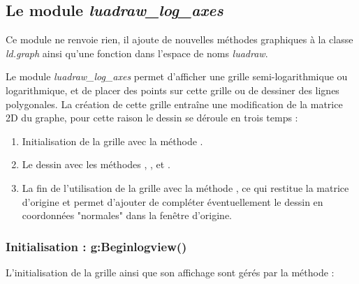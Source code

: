 \subsection{Le module \emph{luadraw\_log\_axes}}

Ce module ne renvoie rien, il ajoute de nouvelles méthodes graphiques à la classe \emph{ld.graph} ainsi qu'une fonction dans l'espace de noms \emph{luadraw}.

Le module \emph{luadraw\_log\_axes} permet d'afficher une grille semi-logarithmique ou logarithmique, et de placer des points sur cette grille ou de dessiner des lignes polygonales. La création de cette grille entraîne une modification de la matrice 2D du graphe, pour cette raison le dessin se déroule en trois temps :
    \begin{enumerate}
        \item Initialisation de la grille avec la méthode .
        \item Le dessin avec les méthodes , ,  et .
        \item La fin de l'utilisation de la grille avec la méthode , ce qui restitue la matrice d'origine et permet d'ajouter de compléter éventuellement le dessin en coordonnées "normales" dans la fenêtre d'origine.
    \end{enumerate}
    
\subsubsection{Initialisation :  g:Beginlogview()}  

 L'initialisation de la grille ainsi que son affichage sont gérés par la méthode :
 
